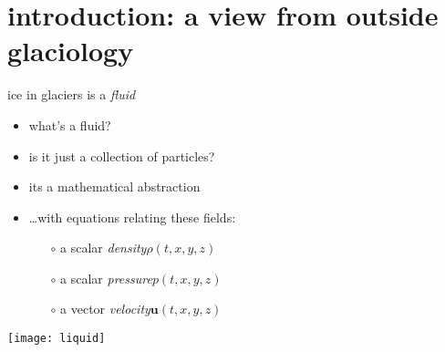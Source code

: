 \section[introduction]{introduction: a view from outside glaciology}

\begin{frame}{ice in glaciers is a \emph{fluid}}

\begin{itemize}
\item what's a fluid?
\item is it just a collection of particles?

\medskip
\item<2> its a mathematical abstraction
\item<2> \dots with equations relating these fields:
  \begin{itemize}
  \item[$\circ$] a scalar \emph{density}\quad $\rho(t,x,y,z)$
  \item[$\circ$] a scalar \emph{pressure}\quad $p(t,x,y,z)$
  \item[$\circ$] a vector \emph{velocity}\quad $\mathbf{u}(t,x,y,z)$
  \end{itemize}
\end{itemize}

\vspace{-2mm}
\texttt{[image: liquid]} \hfill {}
\end{frame}



